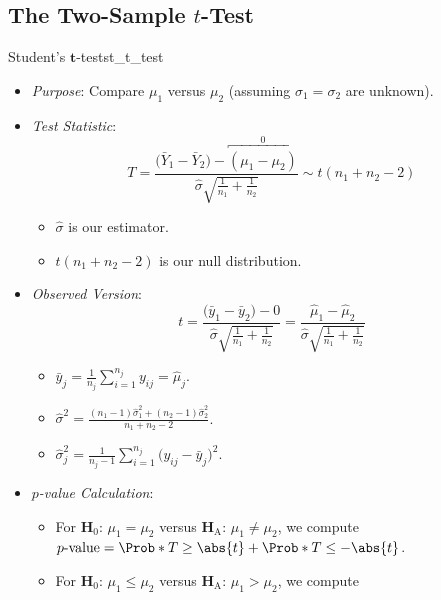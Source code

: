 \subsection{The Two-Sample \texorpdfstring{$ t $}{t}-Test}
\begin{Statistical_Test}{Student's $ \symbf{t} $-test}{st_t_test}
      \begin{itemize}
            \item \emph{Purpose}: Compare $ \mu_1 $ versus $ \mu_2 $ (assuming $ \sigma_1=\sigma_2 $ are unknown).
            \item \emph{Test Statistic}:
                  \[ T=\frac{\bigl(\bar{Y}_1-\bar{Y}_2\bigr)-\overbracket{(\mu_1-\mu_2)}^0}{\displaystyle \hat{\sigma}\sqrt{\frac{1}{n_1}+\frac{1}{n_2}}}\sim t(n_1+n_2-2) \]
                  \begin{itemize}
                        \item $ \hat{\sigma} $ is our estimator.
                        \item $ t(n_1+n_2-2) $ is our null distribution.
                  \end{itemize}
            \item \emph{Observed Version}:
                  \[ t=\frac{\bigl(\bar{y}_1-\bar{y}_2\bigr)-0}{\displaystyle \hat{\sigma}\sqrt{\frac{1}{n_1}+\frac{1}{n_2}}}
                        =\frac{\hat{\mu}_1-\hat{\mu}_2}{\displaystyle \hat{\sigma}\sqrt{\frac{1}{n_1}+\frac{1}{n_2}}} \]
                  \begin{itemize}
                        \item $ \displaystyle \bar{y}_j= \frac{1}{n_j}\sum_{i=1}^{n_j} y_{ij}=\hat{\mu}_j $.
                        \item $ \displaystyle \hat{\sigma}^2=\frac{(n_1-1)\hat{\sigma}_1^2+(n_2-1)\hat{\sigma}_2^2}{n_1+n_2-2} $.
                        \item $ \displaystyle \hat{\sigma}_j^2=\frac{1}{n_j-1} \sum_{i=1}^{n_j} \bigl(y_{ij}-\bar{y}_j\bigr)^2 $.
                  \end{itemize}
            \item \emph{$ p $-value Calculation}:
                  \begin{itemize}
                        \item For $ \mathbf{H}_0 $: $ \mu_1=\mu_2 $ versus $ \mathbf{H}_\text{A} $: $ \mu_1\ne\mu_2 $, we compute
                              $ p\text{-value}=\Prob*{T\ge \abs{t}}+\Prob*{T\le -\abs{t}} $.
                        \item For $ \mathbf{H}_0 $: $ \mu_1\le\mu_2 $ versus $ \mathbf{H}_\text{A} $: $ \mu_1>\mu_2 $, we compute

\end{itemize}
\end{itemize}
\end{Statistical_Test}
